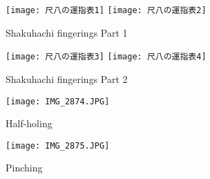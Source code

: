 
\begin{figure}[H]
	\centering
	\texttt{[image: 尺八の運指表1]}
	\vspace{1cm}
	\texttt{[image: 尺八の運指表2]}
	\caption{Shakuhachi fingerings Part 1}
	\label{fig:shakuhachi_fingerings_1}
\end{figure}

\begin{figure}[H]
	\centering
	\texttt{[image: 尺八の運指表3]}
	\vspace{1cm}
	\texttt{[image: 尺八の運指表4]}
	\caption{Shakuhachi fingerings Part 2}
	\label{fig:shakuhachi_fingerings_2}
\end{figure}

\vfill

\begin{figure}
	\centering
	\begin{minipage}{0.4\textwidth}
	\centering
	\texttt{[image: IMG\_2874.JPG]}
	\caption{Half-holing} \label{fig:half-holing}
	\end{minipage}
	\hfill
	\begin{minipage}{0.4\textwidth}
	\texttt{[image: IMG\_2875.JPG]}
	\caption{Pinching} \label{fig:pinching}
	\end{minipage}
\end{figure}
